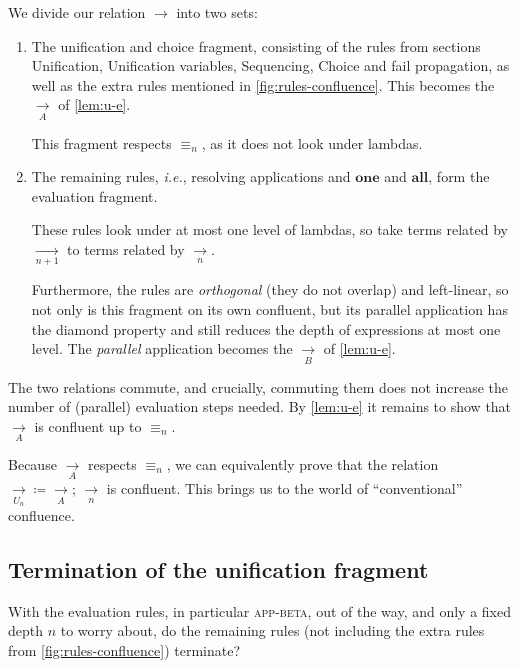 \documentclass[acmsmall,review,dvipsnames]{acmart}
\newcommand{\Varid}[1]{\mathit{#1}}
\newcommand{\ie}{\emph{i.e.}}	%
\newcommand{\rulename}[1]{\textsc{\small #1}}
\newcommand{\movesto}{\longrightarrow}
\begin{document}
We divide our relation $\movesto$ into two sets:
\begin{enumerate}
\item The unification and choice fragment, consisting of the rules from sections Unification,  Unification variables, Sequencing, Choice and fail propagation, as well as the extra rules mentioned in \cref{fig:rules-confluence}. This becomes the \ensuremath{\underset{A}\movesto} of \cref{lem:u-e}.

This fragment respects $\equiv_n$, as it does not look under lambdas.

\item The remaining rules, {\ie}, resolving applications and \ensuremath{\textbf{one}} and \ensuremath{\textbf{all}}, form the evaluation fragment.

These rules look under at most one level of lambdas, so take terms related by \ensuremath{\underset{\Varid{n}\mathbin{+}\mathrm{1}}\movesto} to terms related by \ensuremath{\underset{\Varid{n}}\movesto}.

Furthermore, the rules are \emph{orthogonal} (they do not overlap) and left-linear, so not only is this fragment on its own confluent, but its parallel application has the diamond property and still reduces the depth of expressions at most one level.
The \emph{parallel} application becomes the \ensuremath{\underset{B}\movesto} of \cref{lem:u-e}.
\end{enumerate}

The two relations  commute, and crucially, commuting them does not increase the number of (parallel) evaluation steps needed. By \cref{lem:u-e} it remains to show that \ensuremath{\underset{A}\movesto} is confluent up to \ensuremath{\equiv_{\Varid{n}}}.

Because \ensuremath{\underset{A}\movesto} respects $\equiv_n$, we can equivalently prove that the relation \ensuremath{\underset{U_n}\movesto\mathrel{\coloneqq}\underset{A}\movesto;\,\underset{\Varid{n}}\movesto} is confluent. This brings us to the world of “conventional” confluence.

\subsection{Termination of the unification fragment}
\label{sec:conf-proof-term}

With the evaluation rules, in particular \rulename{app-beta}, out of the way, and only a fixed depth $n$ to worry about, do the remaining rules (not including the extra rules from \cref{fig:rules-confluence}) terminate?
\end{document}
